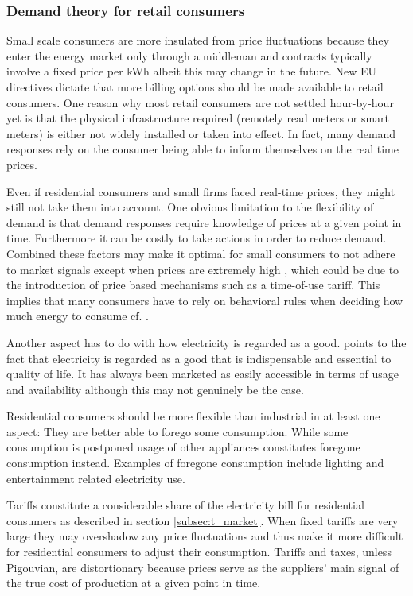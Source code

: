 \subsubsection*{Demand theory for retail consumers}
Small scale consumers are more insulated from price fluctuations because they enter the energy market only through a middleman and contracts typically involve a fixed price per kWh albeit this may change in the future. New EU directives dictate that more billing options should be made available to retail consumers. One reason why most retail consumers are not settled hour-by-hour yet is that the physical infrastructure required (remotely read meters or smart meters) is either not widely installed or taken into effect. In fact, many demand responses rely on the consumer being able to inform themselves on the real time prices.
\bigskip \par
Even if residential consumers and small firms faced real-time prices, they might still not take them into account. One obvious limitation to the flexibility of demand is that demand responses require knowledge of prices at a given point in time. Furthermore it can be costly to take actions in order to reduce demand. Combined these factors may make it optimal for small consumers to not adhere to market signals except when prices are extremely high \citep{wolak2011residential}, which could be due to the introduction of price based mechanisms such as a time-of-use tariff. This implies that many consumers have to rely on behavioral rules when deciding how much energy to consume cf. \citet{kirschen2003demand}.
\par
Another aspect has to do with how electricity is regarded as a good. \citet{kirschen2003demand} points to the fact that electricity is regarded as a good that is indispensable and essential to quality of life. It has always been marketed as easily accessible in terms of usage and availability although this may not genuinely be the case.
\bigskip \par
Residential consumers should be more flexible than industrial in at least one aspect: They are better able to forego some consumption. While some consumption is postponed usage of other appliances constitutes foregone consumption instead. Examples of foregone consumption include lighting and entertainment related electricity use.

Tariffs constitute a considerable share of the electricity bill for residential consumers as described in section \ref{subsec:t_market}. When fixed tariffs are very large they may overshadow any price fluctuations and thus make it more difficult for residential consumers to adjust their consumption. Tariffs and taxes, unless Pigouvian, are distortionary because prices serve as the suppliers' main signal of the true cost of production at a given point in time.

